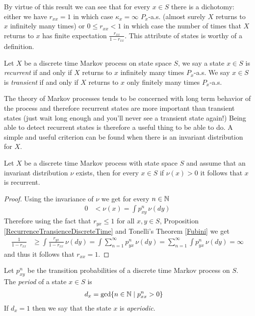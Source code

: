 By virtue of this result we can see that for every $x \in S$ there is
a dichotomy: either we have $r_{xx} = 1$ in which case $\kappa_x =
\infty$ $P_x$-a.s. (almost surely $X$ returns to $x$ infinitely many
times) or $0 \leq r_{xx} < 1$ in which case the number of times that
$X$ returns to $x$ has finite expectation $\frac{r_{xx}}{1-r_{xx}}$.
This attribute of states is worthy of a definition.
\begin{defn}Let $X$ be a discrete time Markov process on state space
  $S$, we say a state $x \in S$ is \emph{recurrent} if and only if $X$
  returns to $x$ infinitely many times $P_x$-a.s.  We say $x \in S$ is
  \emph{transient} if and only if $X$  returns to $x$ only finitely many times $P_x$-a.s.
\end{defn}

The theory of Markov processes tends to be concerned with long term
behavior of the process and therefore recurrent states are more
important than transient states (just wait long enough and you'll
never see a transient state again!)  Being able to detect recurrent
states is therefore a useful thing to be able to do.  A simple and
useful criterion can be found when there is an invariant distribution
for $X$.

\begin{prop}\label{RecurrenceFromInvariantDistribution}Let $X$ be a discrete time Markov process with state space
  $S$ and assume that an invariant distribution $\nu$ exists, then for
  every $x \in S$ if $\nu(x) > 0$ it follows that $x$ is recurrent.
\end{prop}
\begin{proof}
Using the invariance of $\nu$ we get for every $n \in \mathbb{N}$
\begin{align*}
0 &< \nu(x) = \int p^n_{xy} \, \nu(dy)
\end{align*}
Therefore using the fact that $r_{yx} \leq 1$ for all $x,y \in S$,
Proposition \ref{RecurrenceTransienceDiscreteTime} and Tonelli's Theorem \ref{Fubini} we get
\begin{align*}
\frac{1}{1 - r_{xx}} &\geq \int \frac{r_{yx}}{1-r_{xx}} \, \nu(dy) =
\int \sum_{n=1}^\infty p^n_{yx} \, \nu(dy) = \sum_{n=1}^\infty\int
p^n_{yx} \, \nu(dy) = \infty
\end{align*}
and thus it follows that $r_{xx} = 1$.
\end{proof}

\begin{defn}Let $p^n_{xy}$ be the transition probabilities of a
  discrete time Markov process on $S$.  The \emph{period} of a state
  $x \in S$ is 
\begin{align*}
d_x &= \gcd \lbrace n \in \mathbb{N} \mid p^n_{xx} > 0 \rbrace
\end{align*}
If $d_x = 1$ then we say that the state $x$ is \emph{aperiodic}.
\end{defn}

